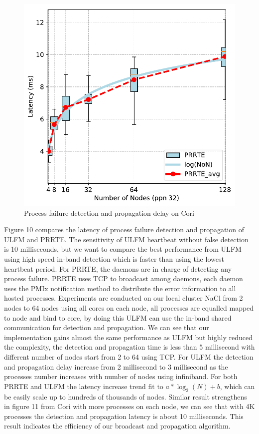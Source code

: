 \documentclass[sigconf]{acmart}
\begin{document}
\begin{figure}[h]
  \centering
  \includegraphics[width=\linewidth]{Cori_Process_Failure_fit.pdf}
  \caption{Process failure detection and propagation delay on Cori}
\end{figure}

Figure 10 compares the latency of process failure detection and propagation of ULFM and PRRTE. The sensitivity of ULFM heartbeat without false detection is 10 milliseconds, but we want to compare the best performance from ULFM using high speed in-band detection which is faster than using the lowest heartbeat period. For PRRTE, the daemons are in charge of detecting any process failure. PRRTE uses TCP to broadcast among daemons, each daemon uses the PMIx notification method to distribute the error information to all hosted processes. Experiments are conducted on our local cluster NaCl from 2 nodes to 64 nodes using all cores on each node, all processes are equalled mapped to node and bind to core, by doing this ULFM can use the in-band shared communication for detection and propagation. We can see that our implementation gains almost the same performance as ULFM but highly reduced the complexity, the detection and propagation time is less than 5 millisecond with different number of nodes start from 2 to 64 using TCP. For ULFM the detection and propagation delay increase from 2 millisecond to 3 millisecond as the processes number increases with number of nodes using infiniband. For both PRRTE and ULFM the latency increase trend fit to $ a*\log_2(N) + b $, which can be easily scale up to hundreds of thousands of nodes. Similar result strengthens in figure 11 from Cori with more processes on each node, we can see that with 4K processes the detection and propagation latency is about 10 milliseconds. This result indicates the efficiency of our broadcast and propagation algorithm.  
\end{document}
